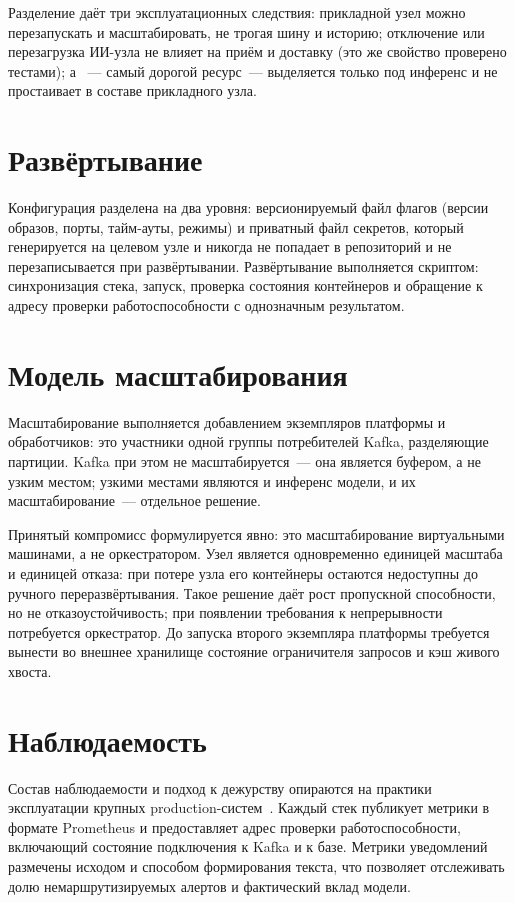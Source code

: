 \documentclass[utf8x, 12pt]{G7-32} %
\begin{document}
Разделение даёт три эксплуатационных следствия: прикладной узел можно
перезапускать и масштабировать, не трогая шину и историю; отключение или
перезагрузка ИИ-узла не влияет на приём и доставку (это же свойство проверено
тестами); а ~--- самый дорогой ресурс~--- выделяется только под инференс и
не простаивает в составе прикладного узла.

\section{Развёртывание}
Конфигурация разделена на два уровня: версионируемый файл флагов (версии
образов, порты, тайм-ауты, режимы) и приватный файл секретов, который
генерируется на целевом узле и никогда не попадает в репозиторий и не
перезаписывается при развёртывании. Развёртывание выполняется скриптом:
синхронизация стека, запуск, проверка состояния контейнеров и обращение к
адресу проверки работоспособности с однозначным результатом.

\section{Модель масштабирования}
Масштабирование выполняется добавлением экземпляров платформы и обработчиков:
это участники одной группы потребителей Kafka, разделяющие партиции.
Kafka при этом не масштабируется~--- она является буфером, а не узким местом;
узкими местами являются  и инференс модели, и их масштабирование~---
отдельное решение.

Принятый компромисс формулируется явно: это масштабирование виртуальными
машинами, а не оркестратором. Узел является одновременно единицей масштаба и
единицей отказа: при потере узла его контейнеры остаются недоступны до ручного
переразвёртывания. Такое решение даёт рост пропускной способности, но не
отказоустойчивость; при появлении требования к непрерывности потребуется
оркестратор. До запуска второго экземпляра платформы требуется вынести во
внешнее хранилище состояние ограничителя запросов и кэш живого хвоста.

\section{Наблюдаемость}
Состав наблюдаемости и подход к дежурству опираются на практики эксплуатации
крупных production-систем~\cite{beyer2016, beyer2018}.
Каждый стек публикует метрики в формате Prometheus и предоставляет адрес
проверки работоспособности, включающий состояние подключения к Kafka и к базе.
Метрики уведомлений размечены исходом и способом формирования текста, что
позволяет отслеживать долю немаршрутизируемых алертов и фактический вклад
модели.
\end{document}
